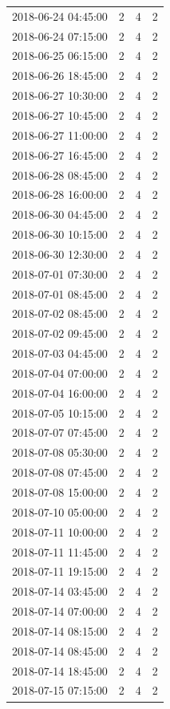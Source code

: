 \begin{tabular}{lrrr}
2018-06-24 04:45:00 & 2 & 4 & 2 \\
2018-06-24 07:15:00 & 2 & 4 & 2 \\
2018-06-25 06:15:00 & 2 & 4 & 2 \\
2018-06-26 18:45:00 & 2 & 4 & 2 \\
2018-06-27 10:30:00 & 2 & 4 & 2 \\
2018-06-27 10:45:00 & 2 & 4 & 2 \\
2018-06-27 11:00:00 & 2 & 4 & 2 \\
2018-06-27 16:45:00 & 2 & 4 & 2 \\
2018-06-28 08:45:00 & 2 & 4 & 2 \\
2018-06-28 16:00:00 & 2 & 4 & 2 \\
2018-06-30 04:45:00 & 2 & 4 & 2 \\
2018-06-30 10:15:00 & 2 & 4 & 2 \\
2018-06-30 12:30:00 & 2 & 4 & 2 \\
2018-07-01 07:30:00 & 2 & 4 & 2 \\
2018-07-01 08:45:00 & 2 & 4 & 2 \\
2018-07-02 08:45:00 & 2 & 4 & 2 \\
2018-07-02 09:45:00 & 2 & 4 & 2 \\
2018-07-03 04:45:00 & 2 & 4 & 2 \\
2018-07-04 07:00:00 & 2 & 4 & 2 \\
2018-07-04 16:00:00 & 2 & 4 & 2 \\
2018-07-05 10:15:00 & 2 & 4 & 2 \\
2018-07-07 07:45:00 & 2 & 4 & 2 \\
2018-07-08 05:30:00 & 2 & 4 & 2 \\
2018-07-08 07:45:00 & 2 & 4 & 2 \\
2018-07-08 15:00:00 & 2 & 4 & 2 \\
2018-07-10 05:00:00 & 2 & 4 & 2 \\
2018-07-11 10:00:00 & 2 & 4 & 2 \\
2018-07-11 11:45:00 & 2 & 4 & 2 \\
2018-07-11 19:15:00 & 2 & 4 & 2 \\
2018-07-14 03:45:00 & 2 & 4 & 2 \\
2018-07-14 07:00:00 & 2 & 4 & 2 \\
2018-07-14 08:15:00 & 2 & 4 & 2 \\
2018-07-14 08:45:00 & 2 & 4 & 2 \\
2018-07-14 18:45:00 & 2 & 4 & 2 \\
2018-07-15 07:15:00 & 2 & 4 & 2 \\

\end{tabular}

